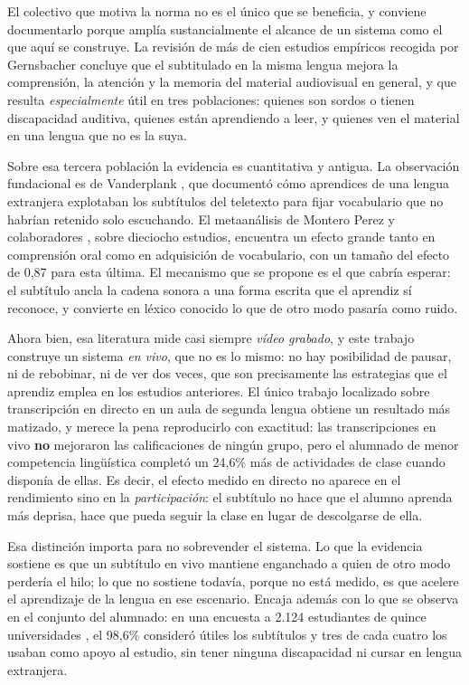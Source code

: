 El colectivo que motiva la norma no es el único que se beneficia, y conviene documentarlo
porque amplía sustancialmente el alcance de un sistema como el que aquí se construye. La
revisión de más de cien estudios empíricos recogida por Gernsbacher
\cite{gernsbacher2015captions} concluye que el subtitulado en la misma lengua mejora la
comprensión, la atención y la memoria del material audiovisual en general, y que resulta
\emph{especialmente} útil en tres poblaciones: quienes son sordos o tienen discapacidad
auditiva, quienes están aprendiendo a leer, y quienes ven el material en una lengua que no
es la suya.

Sobre esa tercera población la evidencia es cuantitativa y antigua. La observación
fundacional es de Vanderplank \cite{vanderplank1988teletext}, que documentó cómo aprendices
de una lengua extranjera explotaban los subtítulos del teletexto para fijar vocabulario que
no habrían retenido solo escuchando. El metaanálisis de Montero Perez y colaboradores
\cite{monteroperez2013meta}, sobre dieciocho estudios, encuentra un efecto grande tanto en
comprensión oral como en adquisición de vocabulario, con un tamaño del efecto de 0,87 para
esta última. El mecanismo que se propone es el que cabría esperar: el subtítulo ancla la
cadena sonora a una forma escrita que el aprendiz sí reconoce, y convierte en léxico
conocido lo que de otro modo pasaría como ruido.

Ahora bien, esa literatura mide casi siempre \emph{vídeo grabado}, y este trabajo construye
un sistema \emph{en vivo}, que no es lo mismo: no hay posibilidad de pausar, ni de rebobinar,
ni de ver dos veces, que son precisamente las estrategias que el aprendiz emplea en los
estudios anteriores. El único trabajo localizado sobre transcripción en directo en un aula
de segunda lengua \cite{wang2023transcripts} obtiene un resultado más matizado, y merece la
pena reproducirlo con exactitud: las transcripciones en vivo \textbf{no} mejoraron las
calificaciones de ningún grupo, pero el alumnado de menor competencia lingüística completó un
24,6\% más de actividades de clase cuando disponía de ellas. Es decir, el efecto medido en
directo no aparece en el rendimiento sino en la \emph{participación}: el subtítulo no hace
que el alumno aprenda más deprisa, hace que pueda seguir la clase en lugar de descolgarse de
ella.

Esa distinción importa para no sobrevender el sistema. Lo que la evidencia sostiene es que
un subtítulo en vivo mantiene enganchado a quien de otro modo perdería el hilo; lo que no
sostiene todavía, porque no está medido, es que acelere el aprendizaje de la lengua en ese
escenario. Encaja además con lo que se observa en el conjunto del alumnado: en una encuesta
a 2.124 estudiantes de quince universidades \cite{linder2016captions}, el 98,6\% consideró
útiles los subtítulos y tres de cada cuatro los usaban como apoyo al estudio, sin tener
ninguna discapacidad ni cursar en lengua extranjera.

